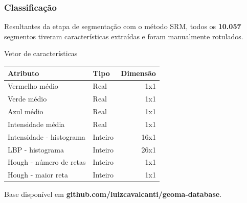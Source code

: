 \documentclass[t]{beamer}
\begin{document}
\begin{frame}[c]
	\frametitle{Classificação}

	Resultantes da etapa de segmentação com o método SRM, todos os \textbf{10.057} segmentos tiveram características extraídas e foram manualmente rotulados.
	
	\vspace{0.5cm}
	
	\centering
	Vetor de características

	\small{
		\begin{table}[h]
		\centering
		\begin{tabulary}{\linewidth}{|L|L|R|}
		\hline
		\textbf{Atributo} & \textbf{Tipo} & \textbf{Dimensão} \\ \hline
		Vermelho médio            & Real    &  1x1 \\ \hline
		Verde médio               & Real    &  1x1 \\ \hline
		Azul médio                & Real    &  1x1 \\ \hline
		Intensidade média         & Real    &  1x1 \\ \hline
		Intensidade - histograma  & Inteiro & 16x1 \\ \hline
		LBP - histograma          & Inteiro & 26x1 \\ \hline
		Hough - número de retas   & Inteiro &  1x1 \\ \hline
		Hough - maior reta        & Inteiro &  1x1 \\ \hline
		\end{tabulary}
		\end{table}
	}

	\centering
	Base disponível em \textbf{github.com/luizcavalcanti/geoma-database}.

\end{frame}
\end{document}
